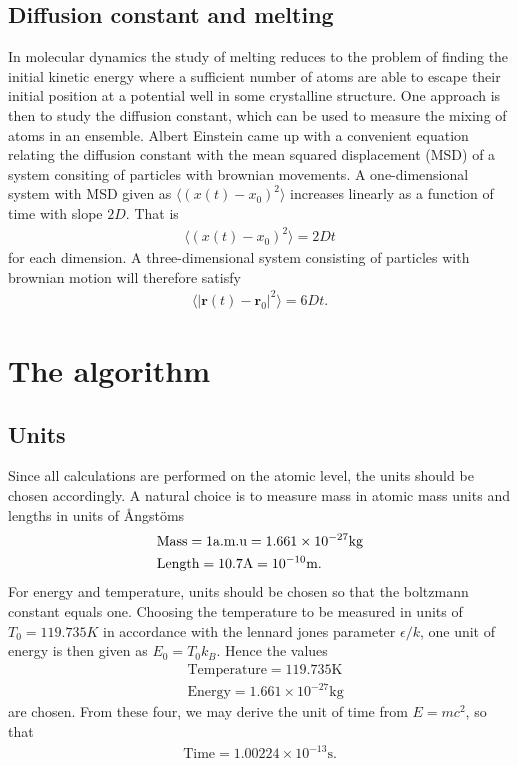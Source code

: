 \documentclass[twoside,utf8]{article}
\newcommand{\EQU}[1] { \begin{equation*} \begin{split} #1 \end{split} \end{equation*} }
\newcommand{\expe}[1]{ \langle #1 \rangle }
\begin{document}
\begin{multicols}{2}
\subsection{Diffusion constant and melting}
In molecular dynamics the study of melting reduces to the problem of finding the initial kinetic energy where a sufficient number of atoms are able to escape their initial position at a potential well in some crystalline structure. One approach is then to study the diffusion constant, which can be used to measure the mixing of atoms in an ensemble. Albert Einstein came up with a convenient equation relating the diffusion constant with the mean squared displacement (MSD) of a system consiting of particles with brownian movements\cite{EinsteinD}. A one-dimensional system with MSD given as $\expe{ (x(t)-x_0)^2 }$ increases linearly as a function of time with slope $2D$. That is
\EQU{
\expe{ (x(t)-x_0)^2 } = 2Dt
}
for each dimension. A three-dimensional system consisting of particles with brownian motion will therefore satisfy
\EQU{
\expe{|\mathbf{r}(t)-\mathbf{r}_0|^2}=6Dt.
}




\section{The algorithm}

\subsection{Units}
Since all calculations are performed on the atomic level, the units should be chosen accordingly. A natural choice is to measure mass in atomic mass units and lengths in units of \r{A}ngst{\"o}ms
\EQU{
&\text{Mass} = 1\text{a.m.u} = 1.661\times 10^{-27} \text{kg} \\
&\text{Length} = 1 \text{\r{A}} = 10^{-10} \text{m}.
}
For energy and temperature, units should be chosen so that the boltzmann constant equals one. Choosing the temperature to be measured in units of $T_0 = 119.735 K$ in accordance with the lennard jones parameter $\epsilon/k$, one unit of energy is then given as $E_0=T_0k_B$. Hence the values
\EQU{
&\text{Temperature} = 119.735 \text{K} \\
&\text{Energy} = 1.661\times 10^{-27} \text{kg}
}
are chosen. From these four, we may derive the unit of time from $E=mc^2$, so that
\EQU{
\text{Time} = 1.00224 \times 10^{-13} \text{s}.
}





\end{multicols}
\end{document}
